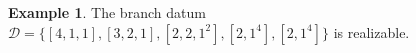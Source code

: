 \documentclass[microtype]{gtpart}     %
\theoremstyle{definition}
\newtheorem{ex}{Example}[section]
\begin{document}


\begin{ex}\label{Ex3}
The branch datum $\mathcal{D} = \{[4,1,1], [3,2,1], [2,2,1^2], [2,1^4], [2,1^4]\}$ is realizable.
\end{ex}
\end{document}
